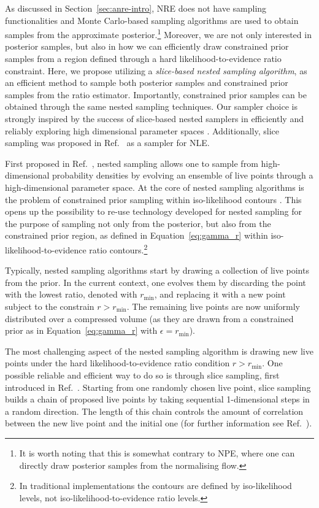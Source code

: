  As discussed in Section~\ref{sec:anre-intro}, NRE does not have sampling functionalities and Monte Carlo-based sampling algorithms are used to obtain samples from the approximate posterior.\footnote{It is worth noting that this is somewhat contrary to NPE, where one can directly draw posterior samples from the normalising flow.} Moreover, we are not only interested in posterior samples, but also in how we can efficiently draw constrained prior samples from a region defined through a hard likelihood-to-evidence ratio constraint. Here, we propose utilizing a \emph{slice-based nested sampling algorithm}, as an efficient method to sample both posterior samples and constrained prior samples from the ratio estimator. Importantly, constrained prior samples can be obtained through the same nested sampling techniques. Our sampler choice is strongly inspired by the success of slice-based nested samplers in efficiently and reliably exploring high dimensional parameter spaces \cite{Handley:2015fda, Handley:2015vkr}. Additionally, slice sampling was proposed in Ref.~\cite{Papamakarios:2018aa} as a sampler for NLE. 

First proposed in Ref.~\cite{Skilling:2006gxv}, nested sampling allows one to sample from high-dimensional probability densities by evolving an ensemble of live points through a high-dimensional parameter space. At the core of nested sampling algorithms is the problem of constrained prior sampling within iso-likelihood contours \cite{Ashton:2022grj}. This opens up the possibility to re-use technology developed for nested sampling for the purpose of sampling not only from the posterior, but also from the constrained prior region, as defined in Equation~\eqref{eq:gamma_r} within iso-likelihood-to-evidence ratio contours.\footnote{In traditional implementations the contours are defined by iso-likelihood levels, not iso-likelihood-to-evidence ratio levels.}

Typically, nested sampling algorithms start by drawing a collection of live points from the prior. In the current context, one evolves them by discarding the point with the lowest ratio, denoted with $r_\mathrm{min}$, and replacing it with a new point subject to the constrain $r > r_\mathrm{min}$. The remaining live points are now uniformly distributed over a compressed volume (as they are drawn from a constrained prior as in Equation~\eqref{eq:gamma_r} with $\epsilon = r_\mathrm{min}$).

The most challenging aspect of the nested sampling algorithm is drawing new live points under the hard likelihood-to-evidence ratio condition $r > r_\mathrm{min}$. One possible reliable and efficient way to do so is through slice sampling, first introduced in Ref.~\cite{Neal:aa}. Starting from one randomly chosen live point, slice sampling builds a chain of proposed live points by taking sequential 1-dimensional steps in a random direction. The length of this chain controls the amount of correlation between the new live point and the initial one (for further information see Ref.~\cite{Buchner:2021kpm}).

